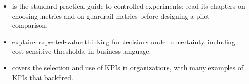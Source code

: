 \begin{itemize}[itemsep=2pt]
  \item \citet{kohavi2020trustworthy} is the standard practical guide to controlled experiments; read its chapters on choosing metrics and on guardrail metrics before designing a pilot comparison.
  \item \citet{provost2013datascience} explains expected-value thinking for decisions under uncertainty, including cost-sensitive thresholds, in business language.
  \item \citet{parmenter2019kpi} covers the selection and use of KPIs in organizations, with many examples of KPIs that backfired.
\end{itemize}
